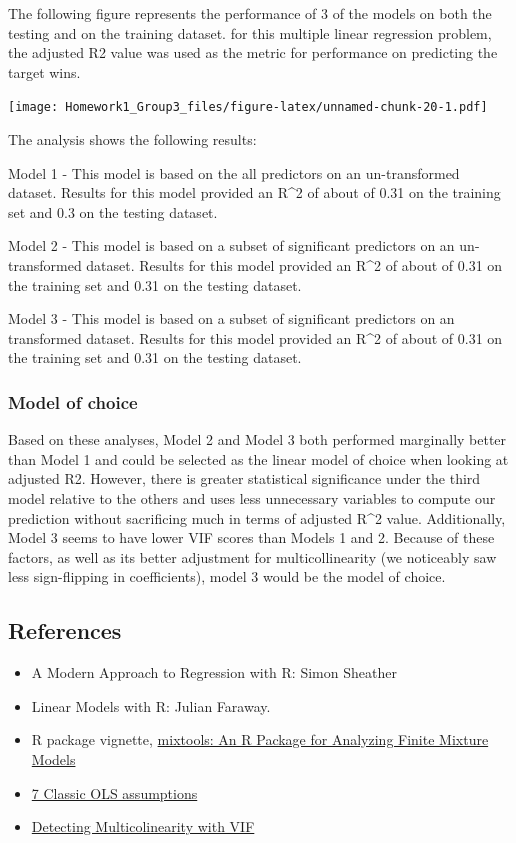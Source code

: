 \documentclass[
]{article}
\providecommand{\tightlist}{%
  \setlength{\itemsep}{0pt}\setlength{\parskip}{0pt}}
\begin{document}
The following figure represents the performance of 3 of the models on
both the testing and on the training dataset. for this multiple linear
regression problem, the adjusted R2 value was used as the metric for
performance on predicting the target wins.

\texttt{[image: Homework1\_Group3\_files/figure-latex/unnamed-chunk-20-1.pdf]}

The analysis shows the following results:

Model 1 - This model is based on the all predictors on an un-transformed
dataset. Results for this model provided an R\^{}2 of about of 0.31 on
the training set and 0.3 on the testing dataset.

Model 2 - This model is based on a subset of significant predictors on
an un-transformed dataset. Results for this model provided an R\^{}2 of
about of 0.31 on the training set and 0.31 on the testing dataset.

Model 3 - This model is based on a subset of significant predictors on
an transformed dataset. Results for this model provided an R\^{}2 of
about of 0.31 on the training set and 0.31 on the testing dataset.

\hypertarget{model-of-choice}{%
\subsubsection{Model of choice}\label{model-of-choice}}

Based on these analyses, Model 2 and Model 3 both performed marginally
better than Model 1 and could be selected as the linear model of choice
when looking at adjusted R2. However, there is greater statistical
significance under the third model relative to the others and uses less
unnecessary variables to compute our prediction without sacrificing much
in terms of adjusted R\^{}2 value. Additionally, Model 3 seems to have
lower VIF scores than Models 1 and 2. Because of these factors, as well
as its better adjustment for multicollinearity (we noticeably saw less
sign-flipping in coefficients), model 3 would be the model of choice.

\hypertarget{references}{%
\subsection{References}\label{references}}

\begin{itemize}
\tightlist
\item
  A Modern Approach to Regression with R: Simon Sheather
\item
  Linear Models with R: Julian Faraway.
\item
  R package vignette,
  \href{https://cran.r-project.org/web/packages/mixtools/vignettes/mixtools.pdf}{mixtools:
  An R Package for Analyzing Finite Mixture Models}
\item
  \href{https://statisticsbyjim.com/regression/ols-linear-regression-assumptions/}{7
  Classic OLS assumptions}
\item
  \href{https://online.stat.psu.edu/stat462/node/180/}{Detecting
  Multicolinearity with VIF}
\end{itemize}
\end{document}
